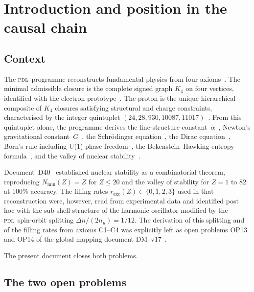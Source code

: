 \documentclass[12pt,a4paper]{article}
\newcommand{\Kfour}{K_4}
\newcommand{\PDL}{\textsc{pdl}}
\newcommand{\quintuplet}{(24,28,930,10087,11017)}
\newcommand{\nuu}{n_u}
\newcommand{\Dn}{\Delta n}
\newcommand{\Nmin}{N_{\min}}
\newcommand{\rexc}{r_{\mathrm{exc}}}
\begin{document}
\tableofcontents
\newpage

\section{Introduction and position in the causal chain}
\label{sec:intro}

\subsection{Context}

The \PDL\ programme reconstructs fundamental physics from four axioms~\cite{PDL_D01_2026,PDL_D02_2026}. The minimal admissible closure is the complete signed graph $\Kfour$ on four vertices, identified with the electron prototype~\cite{PDL_D16a_2026}. The proton is the unique hierarchical composite of $\Kfour$ closures satisfying structural and charge constraints, characterised by the integer quintuplet $\quintuplet$~\cite{PDL_D16b_2026,PDL_D29_2026}. From this quintuplet alone, the programme derives the fine-structure constant~$\alpha$~\cite{PDL_D12_2026}, Newton's gravitational constant~$G$~\cite{PDL_D21_2026,PDL_D43_2026}, the Schr\"{o}dinger equation~\cite{PDL_D32_2026}, the Dirac equation~\cite{PDL_D33_2026}, Born's rule including U(1) phase freedom~\cite{PDL_D34_2026,PDL_D46_2026}, the Bekenstein--Hawking entropy formula~\cite{PDL_D37_2026,PDL_D38_2026}, and the valley of nuclear stability~\cite{PDL_D40_2026}.

Document~D40~\cite{PDL_D40_2026} established nuclear stability as a combinatorial theorem, reproducing $\Nmin(Z) = Z$ for $Z \leq 20$ and the valley of stability for $Z = 1$ to $82$ at 100\% accuracy. The filling rates $\rexc(Z) \in \{0,1,2,3\}$ used in that reconstruction were, however, read from experimental data and identified post hoc with the sub-shell structure of the harmonic oscillator modified by the \PDL\ spin-orbit splitting $\Dn/(2\nuu) = 1/12$. The derivation of this splitting and of the filling rates from axioms C1--C4 was explicitly left as open problems OP13 and OP14 of the global mapping document DM~v17~\cite{PDL_DM_v17_2026}.

The present document closes both problems.

\subsection{The two open problems}
\end{document}
